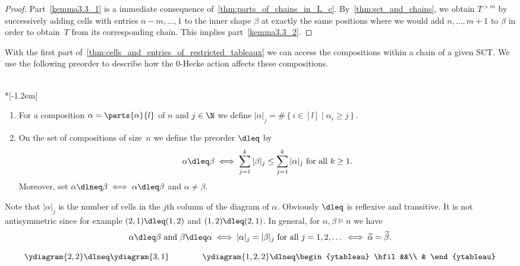 	\begin{proof}
		Part~\eqref{kemma3.3_1} is a immediate consequence of~\cref{thm:parts_of_chains_in_L_c}. 	
		By~\cref{thm:sct_and_chains}, we obtain $T^{>m}$ by successively adding cells with entries $n-m,\dots, 1$ to the inner shape $\beta$ at exactly the same positions where we would add $n,\dots, m+1$ to $\beta$ in order to obtain~$T$ from its corresponding chain. This implies part~\eqref{kemma3.3_2}.
	\end{proof}

With the first part of~\cref{thm:cells_and_entries_of_restricted_tableaux} we can access the compositions within a chain of a given SCT. We use the following preorder to describe how the 0-Hecke action affects these compositions.

\begin{defi}\ \\*[-1.2em]

	\begin{enumerate}
		\item For a composition $\alpha = \parts{\alpha}{l}$ of $n$ and $j\in \N$ we define $|\alpha|_j = \# \left\{ i \in [l] \mid \alpha_i\geq j \right\}$. 
		\item
		 On the set of compositions of size~$n$ we define the preorder $\dleq$ by
		\begin{align*}
			\alpha \dleq \beta \iff \sum_{j=1}^k |\beta|_j \leq \sum_{j=1}^k |\alpha|_j \text{ for all $k \geq 1$.}
		\end{align*} 
		 Moreover, set $\alpha \dlneq \beta \iff \alpha \dleq \beta$ and $\alpha \neq \beta$.
	\end{enumerate}
\end{defi}

Note that $|\alpha|_j$ is the number of cells in the $j$th column of the diagram of $\alpha$.
Obviously $\dleq$ is reflexive and transitive. It is not antisymmetric since for example $(2,1) \dleq (1,2)$ and $(1,2) \dleq (2,1)$. In general, for $\alpha, \beta\vDash n$ we have
\begin{align*}
\alpha \dleq \beta \text{ and } 
\beta \dleq \alpha \iff |\alpha|_j = |\beta|_j \text{ for all $j=1,2,\dots$} \iff \widetilde \alpha = \widetilde \beta.
\end{align*}	

\begin{exam}
	\[
	\ydiagram{2,2} \dlneq \ydiagram{3,1}
	\qquad \qquad 
	\ydiagram{1,2,2}
	\dlneq
	\begin{ytableau}
	\hfil &&\\
	&
	\end{ytableau}		
	\]	
\end{exam}


